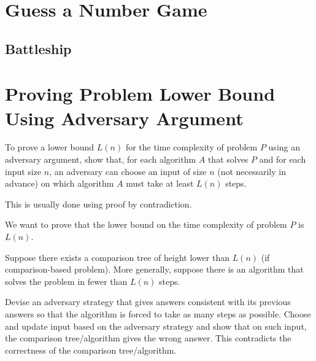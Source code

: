 \section{Guess a Number Game}

\subsection{Battleship}

\section{Proving Problem Lower Bound Using Adversary Argument}

To prove a lower bound $L(n)$ for the time complexity of problem $P$ using an adversary argument, show that, for each algorithm $A$ that solves $P$ and for each input size $n$, an adversary can choose an input of size $n$ (not necessarily in advance) on which algorithm $A$ must take at least $L(n)$ steps.

This is usually done using proof by contradiction.

\begin{thmrule}
    We want to prove that the lower bound on the time complexity of problem $P$ is $L(n)$.

    Suppose there exists a comparison tree of height lower than $L(n)$ (if comparison-based problem). More generally, suppose there is an algorithm that solves the problem in fewer than $L(n)$ steps.

    Devise an adversary strategy that gives answers consistent with its previous answers so that the algorithm is forced to take as many steps as possible. Choose and update input based on the adversary strategy and show that on such input, the comparison tree/algorithm gives the wrong answer. This contradicts the correctness of the comparison tree/algorithm.
\end{thmrule}